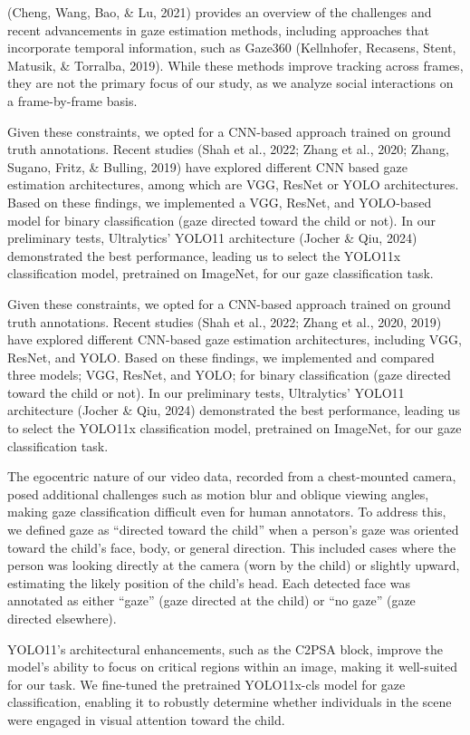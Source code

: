\documentclass[
  man,floatsintext]{apa6}
\begin{document}
(Cheng, Wang, Bao, \& Lu, 2021) provides an overview of the challenges and recent advancements in gaze estimation methods, including approaches that incorporate temporal information, such as Gaze360 (Kellnhofer, Recasens, Stent, Matusik, \& Torralba, 2019). While these methods improve tracking across frames, they are not the primary focus of our study, as we analyze social interactions on a frame-by-frame basis.

Given these constraints, we opted for a CNN-based approach trained on ground truth annotations. Recent studies (Shah et al., 2022; Zhang et al., 2020; Zhang, Sugano, Fritz, \& Bulling, 2019) have explored different CNN based gaze estimation architectures, among which are VGG, ResNet or YOLO architectures. Based on these findings, we implemented a VGG, ResNet, and YOLO-based model for binary classification (gaze directed toward the child or not). In our preliminary tests, Ultralytics' YOLO11 architecture (Jocher \& Qiu, 2024) demonstrated the best performance, leading us to select the YOLO11x classification model, pretrained on ImageNet, for our gaze classification task.

Given these constraints, we opted for a CNN-based approach trained on ground truth annotations. Recent studies (Shah et al., 2022; Zhang et al., 2020, 2019) have explored different CNN-based gaze estimation architectures, including VGG, ResNet, and YOLO. Based on these findings, we implemented and compared three models; VGG, ResNet, and YOLO; for binary classification (gaze directed toward the child or not). In our preliminary tests, Ultralytics' YOLO11 architecture (Jocher \& Qiu, 2024) demonstrated the best performance, leading us to select the YOLO11x classification model, pretrained on ImageNet, for our gaze classification task.

The egocentric nature of our video data, recorded from a chest-mounted camera, posed additional challenges such as motion blur and oblique viewing angles, making gaze classification difficult even for human annotators. To address this, we defined gaze as ``directed toward the child'' when a person's gaze was oriented toward the child's face, body, or general direction. This included cases where the person was looking directly at the camera (worn by the child) or slightly upward, estimating the likely position of the child's head. Each detected face was annotated as either ``gaze'' (gaze directed at the child) or ``no gaze'' (gaze directed elsewhere).

YOLO11's architectural enhancements, such as the C2PSA block, improve the model's ability to focus on critical regions within an image, making it well-suited for our task. We fine-tuned the pretrained YOLO11x-cls model for gaze classification, enabling it to robustly determine whether individuals in the scene were engaged in visual attention toward the child.
\end{document}
